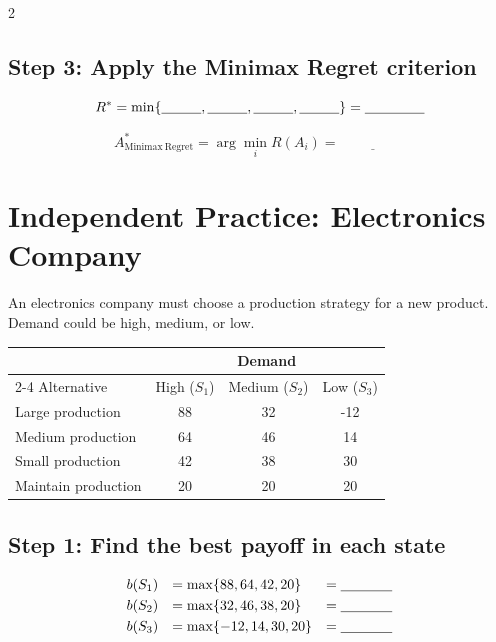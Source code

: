 \begin{multicols}{2}
	\subsection*{Step 3: Apply the Minimax Regret criterion}
	
	\[
	R^*
	=
	\min\{
	\underline{\hspace{1cm}},
	\underline{\hspace{1cm}},
	\underline{\hspace{1cm}},
	\underline{\hspace{1cm}}
	\}
	=
	\underline{\hspace{1.5cm}}
	\]
	
	\[
	A^*_{\mathrm{Minimax\ Regret}}
	=
	\arg\min_i R(A_i)
	=
	\underline{\hspace{2cm}}
	\]
	
	\columnbreak
	
	\section{Independent Practice: Electronics Company}
	
	An electronics company must choose a production strategy for a new product.
	Demand could be high, medium, or low.
	
	\begin{center}
		\renewcommand{\arraystretch}{1.3}
		\small
		\begin{tabular}{lccc}
			\toprule
			& \multicolumn{3}{c}{Demand} \\
			\cmidrule(lr){2-4}
			Alternative & High ($S_1$) & Medium ($S_2$) & Low ($S_3$) \\
			\midrule
			Large production  & 88 & 32 & -12 \\
			Medium production & 64 & 46 & 14 \\
			Small production  & 42 & 38 & 30 \\
			Maintain production & 20 & 20 & 20 \\
			\bottomrule
		\end{tabular}
	\end{center}
	
	\subsection*{Step 1: Find the best payoff in each state}
	
	\[
	\begin{array}{lll}
		b(S_1) &= \max\{88,64,42,20\} &= \underline{\hspace{1.3cm}} \\[3pt]
		b(S_2) &= \max\{32,46,38,20\} &= \underline{\hspace{1.3cm}} \\[3pt]
		b(S_3) &= \max\{-12,14,30,20\} &= \underline{\hspace{1.3cm}}
	\end{array}
	\]
	

\end{multicols}
